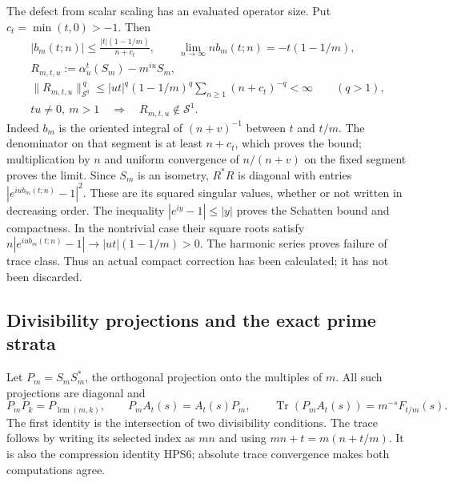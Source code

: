 The defect from scalar scaling has an evaluated
operator size. Put $c_t=\min(t,0)>-1$. Then
\begin{equation}\tag{HPS9}
\begin{gathered}
 |b_m(t;n)|\le
       \frac{|t|(1-1/m)}{n+c_t},\qquad
 \lim_{n\to\infty}n b_m(t;n)=-t(1-1/m),\\
 R_{m,t,u}:=\alpha_u^t(S_m)-m^{iu}S_m,\\
 \|R_{m,t,u}\|_{\mathcal S^q}^{\,q}
 \le |ut|^q(1-1/m)^q\sum_{n\ge1}(n+c_t)^{-q}
                  <\infty\qquad(q>1),\\
 t u\ne0,\ m>1\quad\Longrightarrow\quad
       R_{m,t,u}\notin\mathcal S^1 .
\end{gathered}
\end{equation}
Indeed $b_m$ is the oriented integral of
$(n+v)^{-1}$ between $t$ and $t/m$.
The denominator on that segment is at least $n+c_t$,
which proves the bound; multiplication by $n$ and
uniform convergence of $n/(n+v)$ on the fixed
segment proves the limit. Since $S_m$ is an
isometry, $R^*R$ is diagonal with entries
$|e^{iu b_m(t;n)}-1|^2$. These are its squared
singular values, whether or not written in
decreasing order. The inequality
$|e^{iy}-1|\le|y|$ proves the Schatten bound and
compactness. In the nontrivial case their square
roots satisfy
$n|e^{iu b_m(t;n)}-1|\to|ut|(1-1/m)>0$.
The harmonic series proves failure of trace class.
Thus an actual compact correction has been
calculated; it has not been discarded.

\subsection{Divisibility projections and the exact prime strata}

Let $P_m=S_mS_m^*$, the orthogonal projection onto
the multiples of $m$. All such projections are
diagonal and
\begin{equation}\tag{HPS10}
 P_mP_k=P_{\operatorname{lcm}(m,k)},\qquad
 P_mA_t(s)=A_t(s)P_m,\qquad
 \operatorname{Tr}(P_mA_t(s))=m^{-s}F_{t/m}(s).
\end{equation}
The first identity is the intersection of two
divisibility conditions. The trace follows by
writing its selected index as $mn$ and using
$mn+t=m(n+t/m)$. It is also the compression
identity HPS6; absolute trace convergence makes
both computations agree.

